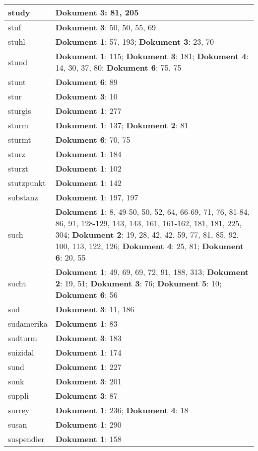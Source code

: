\documentclass[a5paper]{article}
\begin{document}
\begin{longtable}[l]{|l|p{3in}|}
\hline
study & \textbf{Dokument 3}: 81, 205 \\
\hline
stuf & \textbf{Dokument 3}: 50, 50, 55, 69 \\
\hline
stuhl & \textbf{Dokument 1}: 57, 193; \textbf{Dokument 3}: 23, 70 \\
\hline
stund & \textbf{Dokument 1}: 115; \textbf{Dokument 3}: 181; \textbf{Dokument 4}: 14, 30, 37, 80; \textbf{Dokument 6}: 75, 75 \\
\hline
stunt & \textbf{Dokument 6}: 89 \\
\hline
stur & \textbf{Dokument 3}: 10 \\
\hline
sturgis & \textbf{Dokument 1}: 277 \\
\hline
sturm & \textbf{Dokument 1}: 137; \textbf{Dokument 2}: 81 \\
\hline
sturmt & \textbf{Dokument 6}: 70, 75 \\
\hline
sturz & \textbf{Dokument 1}: 184 \\
\hline
sturzt & \textbf{Dokument 1}: 102 \\
\hline
stutzpunkt & \textbf{Dokument 1}: 142 \\
\hline
substanz & \textbf{Dokument 1}: 197, 197 \\
\hline
such & \textbf{Dokument 1}: 8, 49-50, 50, 52, 64, 66-69, 71, 76, 81-84, 86, 91, 128-129, 143, 143, 161, 161-162, 181, 181, 225, 304; \textbf{Dokument 2}: 19, 28, 42, 42, 59, 77, 81, 85, 92, 100, 113, 122, 126; \textbf{Dokument 4}: 25, 81; \textbf{Dokument 6}: 20, 55 \\
\hline
sucht & \textbf{Dokument 1}: 49, 69, 69, 72, 91, 188, 313; \textbf{Dokument 2}: 19, 51; \textbf{Dokument 3}: 76; \textbf{Dokument 5}: 10; \textbf{Dokument 6}: 56 \\
\hline
sud & \textbf{Dokument 3}: 11, 186 \\
\hline
sudamerika & \textbf{Dokument 1}: 83 \\
\hline
sudturm & \textbf{Dokument 3}: 183 \\
\hline
suizidal & \textbf{Dokument 1}: 174 \\
\hline
sund & \textbf{Dokument 1}: 227 \\
\hline
sunk & \textbf{Dokument 3}: 201 \\
\hline
suppli & \textbf{Dokument 3}: 87 \\
\hline
surrey & \textbf{Dokument 1}: 236; \textbf{Dokument 4}: 18 \\
\hline
susan & \textbf{Dokument 1}: 290 \\
\hline
suspendier & \textbf{Dokument 1}: 158 \\

\end{longtable}
\end{document}
